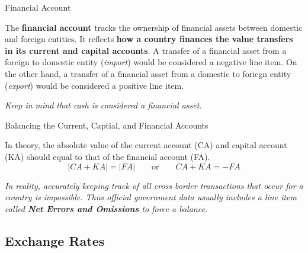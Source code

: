 \documentclass[10pt]{article}
\begin{document}
    \begin{core}{Financial Account}

      The \textbf{financial account} tracks the ownership of financial assets between domestic and foreign entities. It reflects \textbf{how a country finances the value transfers in its current and capital accounts}. A transfer of a financial asset from a foreign to domestic entity (\textit{import}) would be considered a negative line item. On the other hand, a transfer of a financial asset from a domestic to foriegn entity (\textit{export}) would be considered a positive line item.

      \textit{Keep in mind that cash is considered a financial asset.}
  
    \end{core}

    \begin{core}{Balancing the Current, Captial, and Financial Accounts}

      In theory, the absolute value of the current account (CA) and capital account (KA) should equal to that of the financial account (FA).
      \[
        |CA + KA|  = |FA|
        \qquad \text{or} \qquad 
        CA + KA = -FA
      \]

      \textit{In reality, accurately keeping track of all cross border transactions that occur for a country is impossible. Thus official government data usually includes a line item called \textbf{Net Errors and Omissions} to force a balance.}

    \end{core}

  \subsection{Exchange Rates}
\end{document}
